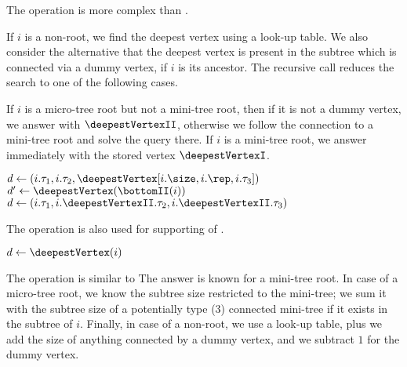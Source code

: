 The operation \deepestVertex{} is more complex than \dep{}.

If $i$ is a non-root, we find the deepest vertex using a look-up table.
We also consider the alternative that the deepest vertex is present in the subtree which is connected via a dummy vertex, if $i$ is its ancestor.
The recursive call reduces the search to one of the following cases.

If $i$ is a micro-tree root but not a mini-tree root, then if it is not a dummy vertex, we answer with $\deepestVertexII$, otherwise we follow the connection to a mini-tree root and solve the query there.
If $i$ is a mini-tree root, we answer immediately with the stored vertex $\deepestVertexI$.

\begin{algorithm}
\begin{algorithmic}
		\State $d \gets (i.\tau_1, i.\tau_2, \deepestVertex[i.\size, i.\rep, i.\tau_3])$ 
		 
			\State $d' \gets \deepestVertex(\bottomII(i))$ 
				\State {}
			\Else
				\State {} 
			\EndIf
		\Else
			\State {}
		\EndIf
		\State $d \gets (i.\tau_1, i.\deepestVertexII.\tau_2, i.\deepestVertexII.\tau_3)$
		 
			\State {} 
		\Else
			\State {}
		\EndIf
	\Else
		\State {}
	\EndIf
\EndFunction
\end{algorithmic}
\end{algorithm}

The operation \deepestVertex{} is also used for supporting of \hei{}.

\begin{algorithm}
\begin{algorithmic}
	\State $d \gets \deepestVertex(i)$
	\State {}
\EndFunction
\end{algorithmic}
\end{algorithm}

The operation \subtreeSize{} is similar to \deepestVertex{}
The answer is known for a mini-tree root.
In case of a micro-tree root, we know the subtree size restricted to the mini-tree; we sum it with the subtree size of a potentially type (3) connected mini-tree if it exists in the subtree of $i$.
Finally, in case of a non-root, we use a look-up table, plus we add the size of anything connected by a dummy vertex, and we subtract $1$ for the dummy vertex.

